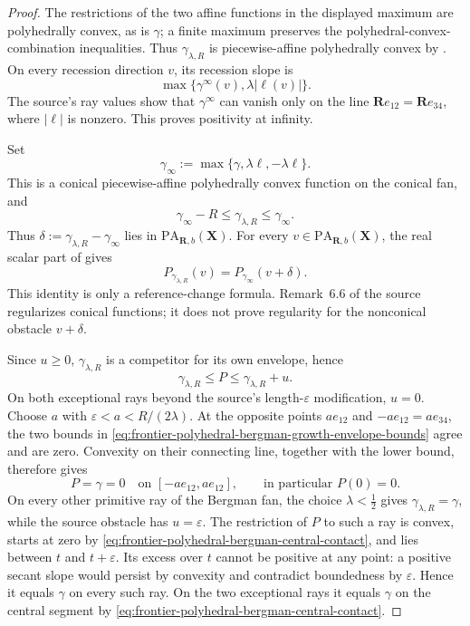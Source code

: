 \begin{proof}
The restrictions of the two affine functions in the displayed maximum are
polyhedrally convex, as is \(\gamma\); a finite maximum preserves the
polyhedral-convex-combination inequalities.  Thus
\(\gamma_{\lambda,R}\) is piecewise-affine polyhedrally convex by
\cite[Definitions~3.1 and~3.3 and Lemma~3.4]{BMPS26}.  On every recession
direction \(v\), its recession slope is
\[
 \max\{\gamma^{\infty}(v),\lambda|\ell(v)|\}.
\]
The source's ray values show that \(\gamma^{\infty}\) can vanish only on
the line \(\mathbf R e_{12}=\mathbf R e_{34}\), where
\(|\ell|\) is nonzero.  This proves positivity at infinity.

Set
\[
 \gamma_{\infty}:=\max\{\gamma,\lambda\ell,-\lambda\ell\}.
\]
This is a conical piecewise-affine polyhedrally convex function on the
conical fan, and
\[
 \gamma_{\infty}-R\leq\gamma_{\lambda,R}\leq\gamma_{\infty}.
 \tag{\(\dagger\)}\label{eq:frontier-polyhedral-bergman-bounded-reference-shift}
\]
Thus \(\delta:=\gamma_{\lambda,R}-\gamma_{\infty}\) lies in
\(\mathrm{PA}_{\mathbf R,b}(\mathbf X)\).  For every
\(v\in\mathrm{PA}_{\mathbf R,b}(\mathbf X)\), the real scalar part of
 gives
\[
 P_{\gamma_{\lambda,R}}(v)
   =P_{\gamma_{\infty}}(v+\delta).
 \tag{\(\ddagger\)}\label{eq:frontier-polyhedral-bergman-envelope-shift}
\]
This identity is only a reference-change formula.  Remark~6.6 of the source
regularizes conical functions; it does not prove regularity for the
nonconical obstacle \(v+\delta\).

Since \(u\geq0\), \(\gamma_{\lambda,R}\) is a competitor for its own
envelope, hence
\[
 \gamma_{\lambda,R}\leq P\leq\gamma_{\lambda,R}+u.
 \tag{\(*\)}\label{eq:frontier-polyhedral-bergman-growth-envelope-bounds}
\]
On both exceptional rays beyond the source's length-\(\varepsilon\)
modification, \(u=0\).  Choose
\(a\) with \(\varepsilon<a<R/(2\lambda)\).  At the opposite points
\(ae_{12}\) and \(-ae_{12}=ae_{34}\), the two bounds in
\eqref{eq:frontier-polyhedral-bergman-growth-envelope-bounds} agree and
are zero.  Convexity on their connecting line, together with the lower
bound, therefore gives
\[
 P=\gamma=0
 \quad\text{on }[-ae_{12},ae_{12}],
 \qquad\text{in particular }P(0)=0.
 \tag{\(**\)}\label{eq:frontier-polyhedral-bergman-central-contact}
\]
On every other primitive ray of the Bergman fan, the choice
\(\lambda<\tfrac12\) gives
\(\gamma_{\lambda,R}=\gamma\), while the source obstacle has
\(u=\varepsilon\).  The restriction of \(P\) to such a ray is convex,
starts at zero by \eqref{eq:frontier-polyhedral-bergman-central-contact},
and lies between \(t\) and \(t+\varepsilon\).  Its excess over \(t\)
cannot be positive at any point: a positive secant slope would persist by
convexity and contradict boundedness by \(\varepsilon\).  Hence it equals
\(\gamma\) on every such ray.  On the two exceptional rays it equals
\(\gamma\) on the central segment by
\eqref{eq:frontier-polyhedral-bergman-central-contact}.


\end{proof}
